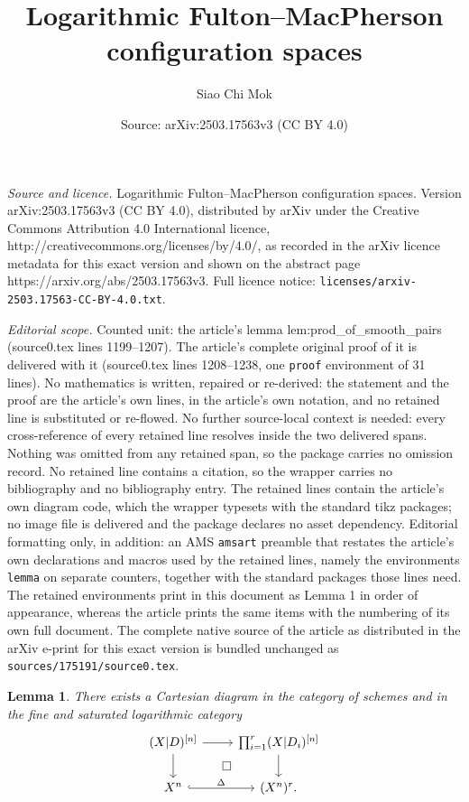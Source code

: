 \documentclass[10pt,a4paper]{amsart}
\title{Logarithmic Fulton--MacPherson configuration spaces}
\author{Siao Chi Mok}
\date{Source: arXiv:2503.17563v3 (CC BY 4.0)}
\newtheorem{lemma}{Lemma}
\def\logProd{(X|D)^{[n]}}
\newcommand{\logProdexample}[3]{(#1|#2)^{[#3]}}
\newcommand{\pullback}[1]{\arrow[#1, phantom, "\square" , color=black]}
\begin{document}
\maketitle

\noindent\emph{Source and licence.} Logarithmic Fulton--MacPherson configuration spaces. Version arXiv:2503.17563v3 (CC BY 4.0), distributed by arXiv under the Creative Commons Attribution 4.0 International licence, http://creativecommons.org/licenses/by/4.0/, as recorded in the arXiv licence metadata for this exact version and shown on the abstract page https://arxiv.org/abs/2503.17563v3. Full licence notice: \texttt{licenses/arxiv-2503.17563-CC-BY-4.0.txt}.\par\smallskip

\noindent\textit{Editorial scope.} Counted unit: the article's lemma lem:prod\_of\_smooth\_pairs (source0.tex lines 1199--1207). The article's complete original proof of it is delivered with it (source0.tex lines 1208--1238, one \texttt{proof} environment of 31 lines). No mathematics is written, repaired or re-derived: the statement and the proof are the article's own lines, in the article's own notation, and no retained line is substituted or re-flowed.  No further source-local context is needed: every cross-reference of every retained line resolves inside the two delivered spans.  Nothing was omitted from any retained span, so the package carries no omission record.  No retained line contains a citation, so the wrapper carries no bibliography and no bibliography entry.  The retained lines contain the article's own diagram code, which the wrapper typesets with the standard tikz packages; no image file is delivered and the package declares no asset dependency.  Editorial formatting only, in addition: an AMS \texttt{amsart} preamble that restates the article's own declarations and macros used by the retained lines, namely the environments \texttt{lemma} on separate counters, together with the standard packages those lines need.  The retained environments print in this document as Lemma 1 in order of appearance, whereas the article prints the same items with the numbering of its own full document.  The complete native source of the article as distributed in the arXiv e-print for this exact version is bundled unchanged as \texttt{sources/175191/source0.tex}.
\begin{lemma} \label{lem:prod_of_smooth_pairs}
	There exists a Cartesian diagram in the category of schemes and in the fine and saturated logarithmic category
	\begin{equation}\label{cd:prod_of_smooth}
		\begin{tikzcd}
			\logProd \arrow[r] \arrow[d] \pullback{rd} & \prod_{i=1}^{r} \logProdexample{X}{D_i}{n} \arrow[d]\\
			X^n \arrow[r, "\Delta", hook] & (X^n)^r.
		\end{tikzcd}
	\end{equation}
\end{lemma}
\end{document}
